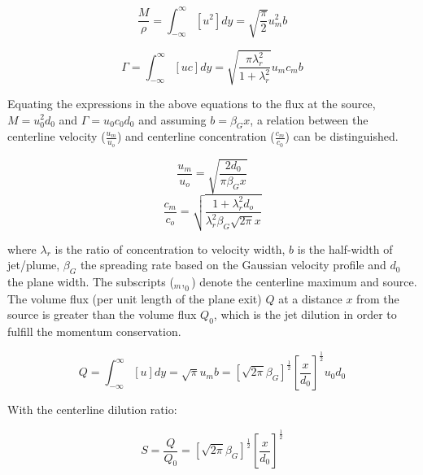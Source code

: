 \begin{equation}
    \frac{M}{\rho} = \int_{-\infty}^{\infty} [u^2] dy = \sqrt{\frac{\pi}{2}} u_m^2 b
\end{equation}

\begin{equation}
    \Gamma = \int_{-\infty}^{\infty} [uc] dy = \sqrt{\frac{\pi\lambda_r^2}{1+\lambda_r^2}}u_m c_m b
\end{equation}

\noindent Equating the expressions in the above equations to the flux at the source, $M = u_0^2 d_0$ and $\Gamma = u_0 c_0 d_0$ and assuming $b=\beta_G x$, a relation between the centerline velocity ($\frac{u_m}{u_o}$) and centerline concentration ($\frac{c_m}{c_0}$) can be distinguished. 

\begin{equation}
    \frac{u_m}{u_o} = \sqrt{\frac{2 d_0}{\pi \beta_G x}}
\end{equation}
\begin{equation}
    \frac{c_m}{c_o} = \sqrt{\frac{1+\lambda_r^2 d_o}{\lambda_r^2 \beta_G \sqrt{2\pi} x}}
\end{equation}



\noindent where $\lambda_r$ is the ratio of concentration to velocity width, $b$ is the half-width of jet/plume, $\beta_G$ the spreading rate based on the Gaussian velocity profile and $d_0$ the plane width. The subscripts ($_m , _0$) denote the centerline maximum and source. The volume flux (per unit length of the plane exit) $Q$ at a distance $x$ from the source is greater than the volume flux $Q_0$, which is the jet dilution in order to fulfill the momentum conservation.

\begin{equation}
    Q = \int_{-\infty}^{\infty} [u] dy = \sqrt{\pi} u_m b = [{\sqrt{2\pi} \beta_G }]^\frac{1}{2} [\frac{x}{d_0}]^\frac{1}{2} u_0 d_0
    \label{eq:Q}
\end{equation}

\noindent With the centerline dilution ratio:

\begin{equation}
    S = \frac{Q}{Q_0} = [\sqrt{2\pi} \beta_G]^\frac{1}{2} [\frac{x}{d_0}]^\frac{1}{2}
\end{equation}

